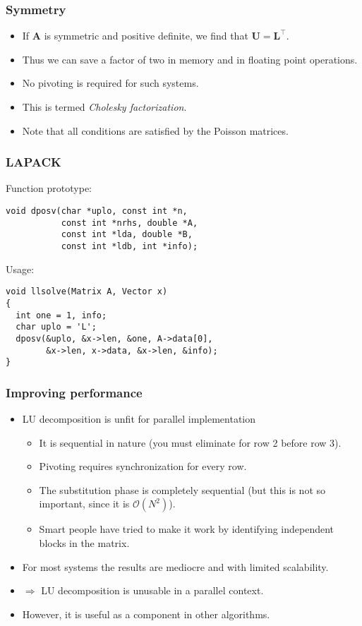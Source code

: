 \begin{frame}
  \frametitle{Symmetry}
  \begin{itemize}
  \item If $\bm A$ is symmetric and positive definite, we find that
    $\bm U = \bm L^\intercal$.
  \item Thus we can save a factor of two in memory and in floating point
    operations.
  \item No pivoting is required for such systems.
  \item This is termed \emph{Cholesky factorization}.
  \item Note that all conditions are satisfied by the Poisson matrices.
  \end{itemize}
\end{frame}

\begin{frame}[fragile]
  \frametitle{LAPACK}
  Function prototype:
  \begin{lstlisting}[style=c]
void dposv(char *uplo, const int *n,
           const int *nrhs, double *A,
           const int *lda, double *B,
           const int *ldb, int *info);
  \end{lstlisting}
  Usage:
  \begin{lstlisting}[style=c]
void llsolve(Matrix A, Vector x)
{
  int one = 1, info;
  char uplo = 'L';
  dposv(&uplo, &x->len, &one, A->data[0],
        &x->len, x->data, &x->len, &info);
}
  \end{lstlisting}
\end{frame}

\begin{frame}
  \frametitle{Improving performance}
  \begin{itemize}
  \item LU decomposition is unfit for parallel implementation
    \begin{itemize}
    \item It is sequential in nature (you must eliminate for row 2 before row
      3).
    \item Pivoting requires synchronization for every row.
    \item The substitution phase is completely sequential (but this is not so
      important, since it is $\mathcal{O}(N^2)$).
    \item Smart people have tried to make it work by identifying independent
      blocks in the matrix.
    \end{itemize}
  \item For most systems the results are mediocre and with limited scalability.
  \item $\Rightarrow$ LU decomposition is unusable in a parallel context.
  \item However, it is useful as a component in other algorithms.
  \end{itemize}
\end{frame}

